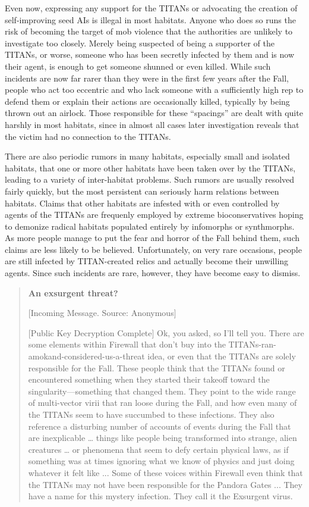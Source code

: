 Even now, expressing any support for the TITANs or advocating the creation of self-improving seed AIs is illegal in most habitats. Anyone who does so runs the risk of becoming the target of mob violence that the authorities are unlikely to investigate too closely. Merely being suspected of being a supporter of the TITANs, or worse, someone who has been secretly infected by them and is now their agent, is enough to get someone shunned or even killed. While such incidents are now far rarer than they were in the first few years after the Fall, people who act too eccentric and who lack someone with a sufficiently high rep to defend them or explain their actions are occasionally killed, typically by being thrown out an airlock. Those responsible for these “spacings” are dealt with quite harshly in most habitats, since in almost all cases later investigation reveals that the victim had no connection to the TITANs. 

There are also periodic rumors in many habitats, especially small and isolated habitats, that one or more other habitats have been taken over by the TITANs, leading to a variety of inter-habitat problems. Such rumors are usually resolved fairly quickly, but the most persistent can seriously harm relations between habitats. Claims that other habitats are infested with or even controlled by agents of the TITANs are frequenly employed by extreme bioconservatives hoping to demonize radical habitats populated entirely by infomorphs or synthmorphs. As more people manage to put the fear and horror of the Fall behind them, such claims are less likely to be believed. Unfortunately, on very rare occasions, people are still infected by TITAN-created relics and actually become their unwilling agents. Since such incidents are rare, however, they have become easy to dismiss. 

\begin{quotation} \textbf{An exsurgent threat?} 

[Incoming Message. Source: Anonymous] 

[Public Key Decryption Complete] Ok, you asked, so I’ll tell you. There are some elements within Firewall that don’t buy into the TITANs-ran-amokand-considered-us-a-threat idea, or even that the TITANs are solely responsible for the Fall. These people think that the TITANs found or encountered something when they started their takeoff toward the singularity—something that changed them. They point to the wide range of multi-vector virii that ran loose during the Fall, and how even many of the TITANs seem to have succumbed to these infections. They also reference a disturbing number of accounts of events during the Fall that are inexplicable … things like people being transformed into strange, alien creatures … or phenomena that seem to defy certain physical laws, as if something was at times ignoring what we know of physics and just doing whatever it felt like ... Some of these voices within Firewall even think that the TITANs may not have been responsible for the Pandora Gates ... They have a name for this mystery infection. They call it the Exsurgent virus. \end{quotation} 

